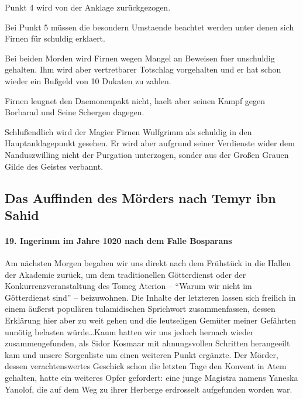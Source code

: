 Punkt 4 wird von der Anklage zurückgezogen.

Bei Punkt 5 müssen die besondern Umstaende beachtet werden unter denen sich Firnen für schuldig erklaert.

Bei beiden Morden wird Firnen wegen Mangel an Beweisen fuer unschuldig gehalten. Ihm wird aber vertretbarer Totschlag vorgehalten und er hat schon wieder ein Bußgeld von 10 Dukaten zu zahlen.

Firnen leugnet den Daemonenpakt nicht, haelt aber seinen Kampf gegen Borbarad und Seine Schergen dagegen.

Schlußendlich wird der Magier Firnen Wulfgrimm als schuldig in den Hauptanklagepunkt gesehen. Er wird aber aufgrund seiner Verdienste wider dem Nanduszwilling nicht der Purgation unterzogen, sonder aus der Großen Grauen Gilde des Geistes verbannt.

\subsection{Das Auffinden des Mörders nach Temyr ibn Sahid}

\paragraph{19. Ingerimm im Jahre 1020 nach dem Falle Bosparans}
Am nächsten Morgen begaben wir uns direkt nach dem Frühstück in die Hallen der Akademie zurück, um dem traditionellen Götterdienst oder der Konkurrenzveranstaltung des Tomeg Aterion -- ``Warum wir nicht im Götterdienst sind'' -- beizuwohnen. Die Inhalte der letzteren lassen sich freilich in einem äußerst populären tulamidischen Sprichwort zusammenfassen, dessen Erklärung hier aber zu weit gehen und die leutseligen Gemüter meiner Gefährten unnötig belasten würde\dots Kaum hatten wir uns jedoch hernach wieder zusammengefunden, als Sidor Kosmaar mit ahnungsvollen Schritten herangeeilt kam und unsere Sorgenliste um einen weiteren Punkt ergänzte. Der Mörder, dessen verachtenswertes Geschick schon die letzten Tage den Konvent in Atem gehalten, hatte ein weiteres Opfer gefordert: eine junge Magistra namens Yaneska Yanolof, die auf dem Weg zu ihrer Herberge erdrosselt aufgefunden worden war.

